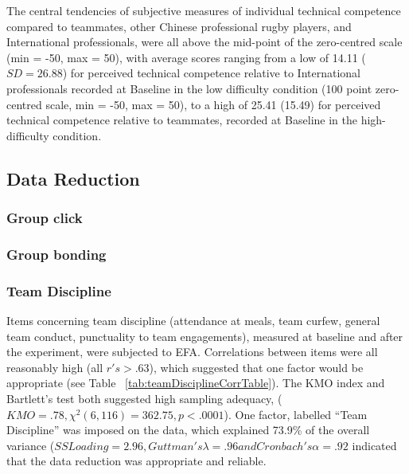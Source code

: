 

The central tendencies of subjective measures of individual technical competence compared to teammates, other Chinese professional rugby players, and International professionals, were all above the mid-point of the zero-centred scale (min = -50, max = 50), with average scores ranging from  a low of 14.11 ($SD = 26.88$) for perceived technical competence relative to International professionals recorded at Baseline in the low difficulty condition (100 point zero-centred scale, min = -50, max = 50), to a high of 25.41 (15.49) for perceived technical competence relative to teammates, recorded at Baseline in the high-difficulty condition.






\subsection{Data Reduction\label{app9:dataReduction}}

\subsubsection{Group click}

\centering
  

\subsubsection{Group bonding}

\centering
  


\subsubsection{Team Discipline\label{app9:teamDisciplineEFA}}
Items concerning team discipline (attendance at meals, team curfew, general team conduct, punctuality to team engagements), measured at baseline and after the experiment, were subjected to EFA.  Correlations between items were all reasonably high (all $r's > .63$), which suggested that one factor would be appropriate (see Table ~\ref{tab:teamDisciplineCorrTable}).
The KMO index and Bartlett's test both suggested high sampling adequacy, ($KMO = .78, \chi^2(6, 116) = 362.75, p < .0001$).  One factor, labelled ``Team Discipline'' was imposed on the data, which explained 73.9\% of the overall variance
($ SS Loading = 2.96, Guttman's \lambda = .96 and Cronbach's \alpha = .92$ indicated that the data reduction was appropriate and reliable.


